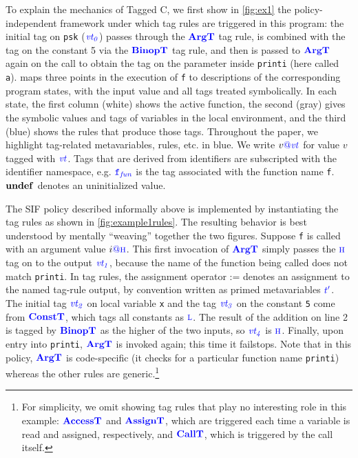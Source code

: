 To explain the mechanics of Tagged C, we first show in \cref{fig:ex1} the policy-independent
framework under which tag rules are triggered in this program: the initial tag on {\tt psk} (\(\vt[_0]\))
passes through the \(\argtname\) tag rule, is combined with the tag on the constant 5 via
the \(\binoptname\) tag rule, and then is passed to \(\argtname\) again on the call
to obtain the tag on the parameter inside {\tt printi} (here called {\tt a}).
 maps three points in the execution of {\tt f} to descriptions of the
corresponding program states, with the input value and all tags treated symbolically.
In each state, the first column (white) shows the active function, the second (gray) gives
the symbolic values and tags of variables in the local environment, and the third (blue)
shows the rules that produce those tags.
Throughout the paper, we highlight tag-related metavariables, rules, etc. in {\color{blue}blue}.
We write \(v\tagat \vt\) for value \(v\) tagged with \(\vt\).
Tags that are derived from identifiers are subscripted with the identifier namespace, e.g.
\(\FN[f]\) is the tag associated with the function name {\tt f}.  
\(\vundef\) denotes an uninitialized value.

The SIF policy described informally above is implemented by instantiating the
tag rules as shown in \cref{fig:example1rules}.  The resulting behavior is best understood
by mentally ``weaving'' together the two figures.
Suppose {\tt f} is called with an argument value \(i \tagat \high\).
This first invocation of \(\argtname\) simply passes the \(\high\) tag on to the output \(\vt[_1]\),
because the name of the function being called does not match {\tt printi}. 
In tag rules, the assignment operator := denotes an assignment to the named tag-rule output, by convention
written as primed metavariables \(\gentag[']\).
The initial tag \(\vt[_2]\) on local variable {\tt x} and the tag \(\vt[_3]\) on the constant {\tt 5}
come from \(\consttname\), which tags all constants as \(\low\).
The result of the addition on line 2 is tagged by \(\binoptname\) as the
higher of the two inputs, so \(\vt[_4]\) is \(\high\). Finally, upon entry into {\tt printi}, \(\argtname\)
is invoked again; this time it failstops.
Note that in this policy, \(\argtname\) is code-specific (it checks for a particular function name {\tt printi})
whereas the other rules are generic.\footnote{
For simplicity, we omit showing tag rules that play no interesting role in this example: 
\(\accesstname\) and \(\assigntname\), 
which are triggered each time a variable is read and assigned, respectively,
and \(\calltname\), which is triggered by the call itself.}


